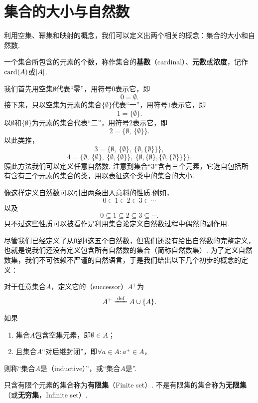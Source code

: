 \section{集合的大小与自然数}
利用空集、幂集和映射的概念，我们可以定义出两个相关的概念：集合的大小和自然数.

\begin{definition}
一个集合所包含的元素的个数，称作集合的\textbf{基数}（cardinal）、\textbf{元数}或\textbf{浓度}，记作\(\operatorname{card}(A)\)或\(\abs{A}\).
\end{definition}

我们首先用空集\(\emptyset\)代表“零”，用符号\(0\)表示它，即\[
0 = \emptyset.
\]接下来，只以空集为元素的集合\(\{\emptyset\}\)代表“一”，用符号\(1\)表示它，即\[
1 = \{\emptyset\}.
\]以\(\emptyset\)和\(\{\emptyset\}\)为元素的集合代表“二”，用符号\(2\)表示它，即\[
2 = \{\emptyset,\ \{\emptyset\}\}.
\]以此类推，\[
3 = \{\emptyset,\ \{\emptyset\},\ \{\emptyset,\{\emptyset\}\}\},
\]\[
4 = \{\emptyset,\ \{\emptyset\},\ \{\emptyset,\{\emptyset\}\},\ \{\emptyset,\{\emptyset\},\{\emptyset,\{\emptyset\}\}\}\}.
\]照此方法我们可以定义任意自然数.
注意到集合“\(3\)”含有三个元素，它选自包括所有含有三个元素的集合的类，用以表征这个类中的集合的大小.

像这样定义自然数可以引出两条出人意料的性质.例如，\[
0 \in 1 \in 2 \in 3 \in \dotsb
\]以及\[
0 \subseteq 1 \subseteq 2 \subseteq 3 \subseteq \dotsb.
\]只不过这些性质可以被看作是利用集合论定义自然数过程中偶然的副作用.

尽管我们已经定义了从\(0\)到\(4\)这五个自然数，但我们还没有给出自然数的完整定义，也就是说我们还没有定义包含所有自然数的集合（简称自然数集）.
为了定义自然数集，我们不可依赖不严谨的自然语言，于是我们给出以下几个初步的概念的定义：
\begin{definition}
对于任意集合\(A\)，定义它的（successor）\(A^+\)为\[
A^+ \defeq A \cup \{A\}.
\]
\end{definition}

\begin{definition}
如果\begin{enumerate}
\item 集合\(A\)包含空集元素，即\(\emptyset \in A\)；
\item 且集合\(A\)“对后继封闭”，即\(\forall a \in A : a^+ \in A\)，%
\end{enumerate}
则称“集合\(A\)是（inductive）”，或“集合\(A\)是”.
\end{definition}

\begin{definition}
只含有限个元素的集合称为\textbf{有限集}（Finite set）.
不是有限集的集合称为\textbf{无限集}（或\textbf{无穷集}，Infinite set）.
\end{definition}

